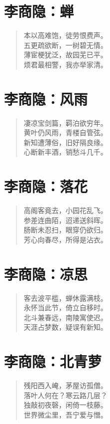 \documentclass[12pt,oneside]{book}
\newenvironment{shici}{%
\begin{verse}\centering\yanti\large\hspace{12pt}}{\end{verse}}
\begin{document}
\begin{common-format}
\chapter{李商隐：蝉}
\begin{shici}
本以高难饱，徒劳恨费声。\\
五更疏欲断，一树碧无情。\\
薄宦梗犹泛，故园芜已平。\\
烦君最相警，我亦举家清。
\end{shici}

\chapter{李商隐：风雨}
\begin{shici}
凄凉宝剑篇，羁泊欲穷年。\\
黄叶仍风雨，青楼自管弦。\\
新知遭薄俗，旧好隔良缘。\\
心断新丰酒，销愁斗几千。
\end{shici}

\chapter{李商隐：落花}
\begin{shici}
高阁客竟去，小园花乱飞。\\
参差连曲陌，迢递送斜晖。\\
肠断未忍扫，眼穿仍欲归。\\
芳心向春尽，所得是沾衣。
\end{shici}

\chapter{李商隐：凉思}
\begin{shici}
客去波平槛，蝉休露满枝。\\
永怀当此节，倚立自移时。\\
北斗兼春远，南陵寓使迟。\\
天涯占梦数，疑误有新知。
\end{shici}

\chapter{李商隐：北青萝}
\begin{shici}
残阳西入崦，茅屋访孤僧。\\
落叶人何在？寒云路几层？\\
独敲初夜磬，闲倚一枝藤。\\
世界微尘里，吾宁爱与憎。
\end{shici}


\end{common-format}
\end{document}
